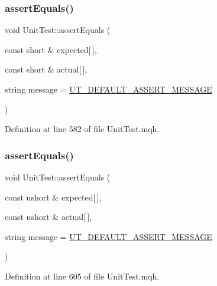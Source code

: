 \subsubsection{\texorpdfstring{assert\+Equals()}{assertEquals()}\hspace{0.1cm}{\footnotesize\ttfamily [18/28]}}
{\footnotesize\ttfamily void Unit\+Test\+::assert\+Equals (\begin{DoxyParamCaption}\item[{const short \&}]{expected\mbox{[}$\,$\mbox{]},  }\item[{const short \&}]{actual\mbox{[}$\,$\mbox{]},  }\item[{string}]{message = {\ttfamily \mbox{\hyperlink{_unit_test_8mqh_a96f5d62188d09039ebc3f443c9120e39}{U\+T\+\_\+\+D\+E\+F\+A\+U\+L\+T\+\_\+\+A\+S\+S\+E\+R\+T\+\_\+\+M\+E\+S\+S\+A\+GE}}} }\end{DoxyParamCaption})}



Definition at line 582 of file Unit\+Test.\+mqh.

\mbox{\label{class_unit_test_a341a195925544c6cd97456fed137c6ee}} 
\subsubsection{\texorpdfstring{assert\+Equals()}{assertEquals()}\hspace{0.1cm}{\footnotesize\ttfamily [19/28]}}
{\footnotesize\ttfamily void Unit\+Test\+::assert\+Equals (\begin{DoxyParamCaption}\item[{const ushort \&}]{expected\mbox{[}$\,$\mbox{]},  }\item[{const ushort \&}]{actual\mbox{[}$\,$\mbox{]},  }\item[{string}]{message = {\ttfamily \mbox{\hyperlink{_unit_test_8mqh_a96f5d62188d09039ebc3f443c9120e39}{U\+T\+\_\+\+D\+E\+F\+A\+U\+L\+T\+\_\+\+A\+S\+S\+E\+R\+T\+\_\+\+M\+E\+S\+S\+A\+GE}}} }\end{DoxyParamCaption})}



Definition at line 605 of file Unit\+Test.\+mqh.

\mbox{\label{class_unit_test_a9a9195df0ee30f3748513a4c7638120b}} 
